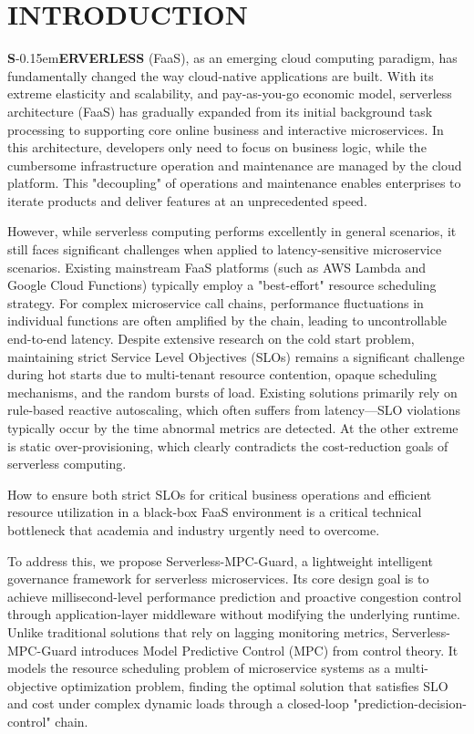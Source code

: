 \documentclass[journal]{IEEEtran}
\begin{document}
\section{INTRODUCTION}
\textbf{S}\kern-0.15em\textbf{ERVERLESS} (FaaS), as an emerging cloud computing paradigm, has fundamentally changed the way cloud-native applications are built. With its extreme elasticity and scalability, and pay-as-you-go economic model, serverless architecture (FaaS) has gradually expanded from its initial background task processing to supporting core online business and interactive microservices. In this architecture, developers only need to focus on business logic, while the cumbersome infrastructure operation and maintenance are managed by the cloud platform. This "decoupling" of operations and maintenance enables enterprises to iterate products and deliver features at an unprecedented speed.

However, while serverless computing performs excellently in general scenarios, it still faces significant challenges when applied to latency-sensitive microservice scenarios. Existing mainstream FaaS platforms (such as AWS Lambda and Google Cloud Functions) typically employ a "best-effort" resource scheduling strategy. For complex microservice call chains, performance fluctuations in individual functions are often amplified by the chain, leading to uncontrollable end-to-end latency. Despite extensive research on the cold start problem, maintaining strict Service Level Objectives (SLOs) remains a significant challenge during hot starts due to multi-tenant resource contention, opaque scheduling mechanisms, and the random bursts of load. Existing solutions primarily rely on rule-based reactive autoscaling, which often suffers from latency—SLO violations typically occur by the time abnormal metrics are detected. At the other extreme is static over-provisioning, which clearly contradicts the cost-reduction goals of serverless computing.

How to ensure both strict SLOs for critical business operations and efficient resource utilization in a black-box FaaS environment is a critical technical bottleneck that academia and industry urgently need to overcome.

To address this, we propose Serverless-MPC-Guard, a lightweight intelligent governance framework for serverless microservices. Its core design goal is to achieve millisecond-level performance prediction and proactive congestion control through application-layer middleware without modifying the underlying runtime. Unlike traditional solutions that rely on lagging monitoring metrics, Serverless-MPC-Guard introduces Model Predictive Control (MPC) from control theory. It models the resource scheduling problem of microservice systems as a multi-objective optimization problem, finding the optimal solution that satisfies SLO and cost under complex dynamic loads through a closed-loop "prediction-decision-control" chain.
\end{document}

